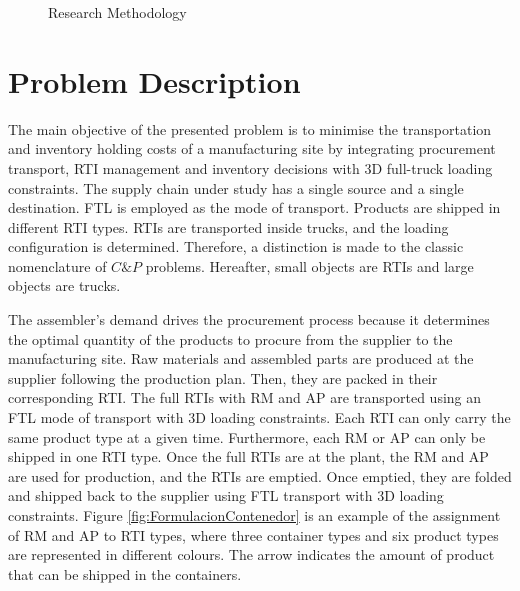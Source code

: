 \begin{figure}[h!]
{
  }
  \caption{Research Methodology}
  \label{fig:tikz1}
\end{figure}

\FloatBarrier




\section{Problem Description}
The main objective of the presented problem is to minimise the transportation and inventory holding costs of a manufacturing site by integrating procurement transport, RTI management and inventory decisions with 3D full-truck loading constraints. The supply chain under study has a single source and a single destination. FTL is employed as the mode of transport. Products are shipped in different RTI types. RTIs are transported inside trucks, and the loading configuration is determined. Therefore, a distinction is made to the classic nomenclature of $C\&P$ problems. Hereafter, small objects are RTIs and large objects are trucks.

The assembler’s demand drives the procurement process because it determines the optimal quantity of the products to procure from the supplier to the manufacturing site. Raw materials and assembled parts are produced at the supplier following the production plan. Then, they are packed in their corresponding RTI. The full RTIs with RM and AP are transported using an FTL mode of transport with 3D loading constraints. Each RTI can only carry the same product type at a given time.
Furthermore, each RM or AP can only be shipped in one RTI type. Once the full RTIs are at the plant, the RM and AP are used for production, and the RTIs are emptied. Once emptied, they are folded and shipped back to the supplier using FTL transport with 3D loading constraints. Figure \ref{fig:FormulacionContenedor} is an example of the assignment of RM and AP to RTI types, where three container types and six product types are represented in different colours. The arrow indicates the amount of product that can be shipped in the containers.


